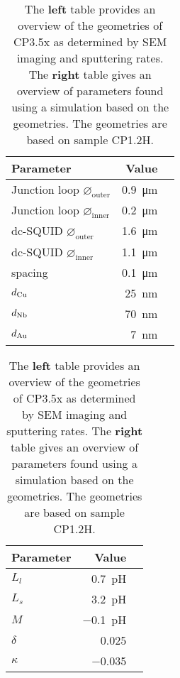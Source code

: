 \begin{table}
	\begin{subtable}{.5\linewidth}
		\centering
		\begin{tabular}{@{}lrr@{}}
			\toprule
			Parameter & Value \\ \midrule
			Junction loop $\diameter_{\text{outer}}$ & \qty{0.9}{\micro\meter} \\
			Junction loop $\diameter_{\text{inner}}$ & \qty{0.2}{\micro\meter} \\
			dc-SQUID $\diameter_{\text{outer}}$ & \qty{1.6}{\micro\meter} \\
			dc-SQUID $\diameter_{\text{inner}}$ & \qty{1.1}{\micro\meter} \\
			spacing & \qty{0.1}{\micro\meter} \\
			$d_{\ce{Cu}}$ & \qty{25}{\nano\meter} \\
			$d_{\ce{Nb}}$ & \qty{70}{\nano\meter} \\
			$d_{\ce{Au}}$ & \qty{7}{\nano\meter} \\
			\bottomrule
		\end{tabular}
    \end{subtable}
    \begin{subtable}{.5\linewidth}
    	\centering
    	\begin{tabular}{@{}lrr@{}}
    		\toprule
    		Parameter & Value \\ \midrule
    		$L_{l}$ & \qty{0.7}{\pico\henry} \\
			$L_{s}$ & \qty{3.2}{\pico\henry} \\
			$M$ & \qty{-0.1}{\pico\henry} \\
			$\delta$ & \num{0.025} \\
			$\kappa$ & \num{-0.035} \\
    		\bottomrule
    	\end{tabular}
    \end{subtable}
    \caption{The \textbf{left} table provides an overview of the geometries of CP3.5x as determined by SEM imaging and sputtering rates. The \textbf{right} table gives an overview of parameters found using a simulation based on the geometries. The geometries are based on sample CP1.2H.}
    \label{tab:CP3.5x-geometries}
\end{table}